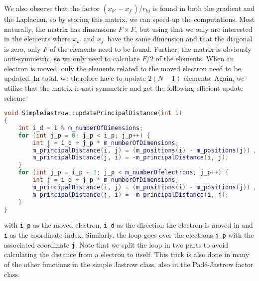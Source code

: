 We also observe that the factor $(x_{k'}-x_{j'})/r_{kj}$ is found in both the gradient and the Laplacian, so by storing this matrix, we can speed-up the computations. Most naturally, the matrix has dimensions $F\times F$, but using that we only are interested in the elements where $x_{k'}$ and $x_{j'}$ have the same dimension and that the diagonal is zero, only $F$ of the elements need to be found. Further, the matrix is obviously anti-symmetric, so we only need to calculate $F/2$ of the elements. When an electron is moved, only the elements related to the moved electron need to be updated. In total, we therefore have to update $2(N-1)$ elements. Again, we utilize that the matrix is anti-symmetric and get the following efficient update scheme
\begin{lstlisting}[language={c++}]
void SimpleJastrow::updatePrincipalDistance(int i)
{
	int i_d = i % m_numberOfDimensions;
	for (int j_p = 0; j_p < i_p; j_p++) {
		int j = i_d + j_p * m_numberOfDimensions;
		m_principalDistance(i, j) = (m_positions(i) - m_positions(j)) / m_distanceMatrix(i_p, j_p);
		m_principalDistance(j, i) = -m_principalDistance(i, j);
	}
	for (int j_p = i_p + 1; j_p < m_numberOfelectrons; j_p++) {
		int j = i_d + j_p * m_numberOfDimensions;
		m_principalDistance(i, j) = (m_positions(i) - m_positions(j)) / m_distanceMatrix(i_p, j_p);
		m_principalDistance(j, i) = -m_principalDistance(i, j);
	}
}
\end{lstlisting}
with \lstinline{i_p} as the moved electron, \lstinline{i_d} as the direction the electron is moved in and \lstinline|i| as the coordinate index. Similarly, the loop goes over the electrons \lstinline{j_p} with the associated coordinate \lstinline{j}. Note that we split the loop in two parts to avoid calculating the distance from a electron to itself. This trick is also done in many of the other functions in the simple Jastrow class, also in the Padé-Jastrow factor class. 

